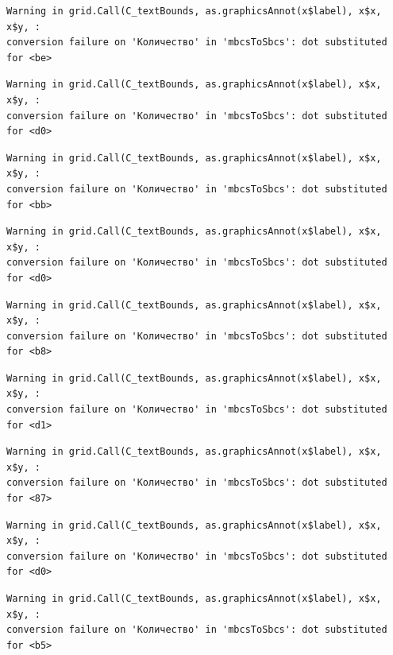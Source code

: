 \documentclass[
  letterpaper,
  DIV=11,
  numbers=noendperiod]{scrreprt}
\theoremstyle{definition}
\theoremstyle{remark}
\begin{document}
\begin{verbatim}
Warning in grid.Call(C_textBounds, as.graphicsAnnot(x$label), x$x, x$y, :
conversion failure on 'Количество' in 'mbcsToSbcs': dot substituted for <be>
\end{verbatim}

\begin{verbatim}
Warning in grid.Call(C_textBounds, as.graphicsAnnot(x$label), x$x, x$y, :
conversion failure on 'Количество' in 'mbcsToSbcs': dot substituted for <d0>
\end{verbatim}

\begin{verbatim}
Warning in grid.Call(C_textBounds, as.graphicsAnnot(x$label), x$x, x$y, :
conversion failure on 'Количество' in 'mbcsToSbcs': dot substituted for <bb>
\end{verbatim}

\begin{verbatim}
Warning in grid.Call(C_textBounds, as.graphicsAnnot(x$label), x$x, x$y, :
conversion failure on 'Количество' in 'mbcsToSbcs': dot substituted for <d0>
\end{verbatim}

\begin{verbatim}
Warning in grid.Call(C_textBounds, as.graphicsAnnot(x$label), x$x, x$y, :
conversion failure on 'Количество' in 'mbcsToSbcs': dot substituted for <b8>
\end{verbatim}

\begin{verbatim}
Warning in grid.Call(C_textBounds, as.graphicsAnnot(x$label), x$x, x$y, :
conversion failure on 'Количество' in 'mbcsToSbcs': dot substituted for <d1>
\end{verbatim}

\begin{verbatim}
Warning in grid.Call(C_textBounds, as.graphicsAnnot(x$label), x$x, x$y, :
conversion failure on 'Количество' in 'mbcsToSbcs': dot substituted for <87>
\end{verbatim}

\begin{verbatim}
Warning in grid.Call(C_textBounds, as.graphicsAnnot(x$label), x$x, x$y, :
conversion failure on 'Количество' in 'mbcsToSbcs': dot substituted for <d0>
\end{verbatim}

\begin{verbatim}
Warning in grid.Call(C_textBounds, as.graphicsAnnot(x$label), x$x, x$y, :
conversion failure on 'Количество' in 'mbcsToSbcs': dot substituted for <b5>
\end{verbatim}
\end{document}
